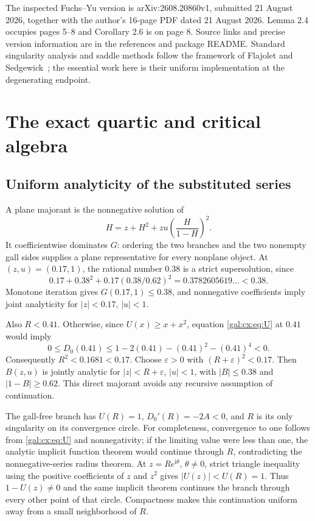\documentclass[11pt,letterpaper]{article}
\numberwithin{equation}{section}
\theoremstyle{definition}\newtheorem{definition}[theorem]{Definition}
\theoremstyle{remark}\newtheorem{remark}[theorem]{Remark}
\newcommand{\ii}{\mathrm i}
\newcommand{\eps}{\varepsilon}
\begin{document}
The inspected Fuchs--Yu version is arXiv:2608.20860v1, submitted 21 August 2026, together with the author's 16-page PDF dated 21 August 2026. Lemma 2.4 occupies pages 5--8 and Corollary 2.6 is on page 8. Source links and precise version information are in the references and package README. Standard singularity analysis and saddle methods follow the framework of Flajolet and Sedgewick~\cite{FS}; the essential work here is their uniform implementation at the degenerating endpoint.

\section{The exact quartic and critical algebra}
\subsection{Uniform analyticity of the substituted series}
A plane majorant is the nonnegative solution of
\begin{equation}\label{gal:cx:eq:majorant}
H=z+H^2+zu\left(\frac{H}{1-H}\right)^2.
\end{equation}
It coefficientwise dominates $G$: ordering the two branches and the two nonempty gall sides supplies a plane representative for every nonplane object. At $(z,u)=(0.17,1)$, the rational number $0.38$ is a strict supersolution, since
\[
0.17+0.38^2+0.17(0.38/0.62)^2=0.3782605619\ldots<0.38.
\]
Monotone iteration gives $G(0.17,1)\le0.38$, and nonnegative coefficients imply joint analyticity for $|z|<0.17$, $|u|<1$.

Also $R<0.41$. Otherwise, since $U(x)\ge x+x^2$, equation \eqref{gal:cx:eq:U} at $0.41$ would imply
\[
0\le D_0(0.41)\le 1-2(0.41)-(0.41)^2-(0.41)^4<0.
\]
Consequently $R^2<0.1681<0.17$. Choose $\eps>0$ with $(R+\eps)^2<0.17$. Then $B(z,u)$ is jointly analytic for $|z|<R+\eps$, $|u|<1$, with $|B|\le0.38$ and $|1-B|\ge0.62$. This direct majorant avoids any recursive assumption of continuation.

The gall-free branch has $U(R)=1$, $D_0'(R)=-2A<0$, and $R$ is its only singularity on its convergence circle. For completeness, convergence to one follows from \eqref{gal:cx:eq:U} and nonnegativity; if the limiting value were less than one, the analytic implicit function theorem would continue through $R$, contradicting the nonnegative-series radius theorem. At $z=Re^{\ii\theta}$, $\theta\ne0$, strict triangle inequality using the positive coefficients of $z$ and $z^2$ gives $|U(z)|<U(R)=1$. Thus $1-U(z)\ne0$ and the same implicit theorem continues the branch through every other point of that circle. Compactness makes this continuation uniform away from a small neighborhood of $R$.
\end{document}
